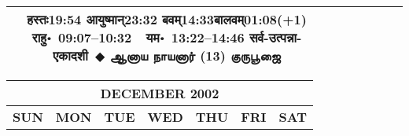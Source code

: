 \documentclass[a3paper,12pt,landscape]{article}
\newcommand{\eventsep}{~$\Diamondblack$ }
\newcommand{\To}{\hspace{1pt}\raisebox{0pt}{\tiny\RIGHTarrow}\hspace{1pt}}
\newcommand{\tamil}[1]{%
{\fontspec[Scale=0.9,FakeStretch=0.9]{Noto Sans Tamil} \footnotesize #1}}
\newcommand{\rahuyama}[2]{%
{राहु॰~\textsf{#1}~~यम॰~\textsf{#2}}
}
\begin{document}
\begin{center}
\begin{tabular}{|c|c|c|c|c|c|c|}
{{\mbox{हस्तः\To{}\textsf{19:54\hspace{2ex}}}}%
{\mbox{आयुष्मान्\To{}\textsf{23:32\hspace{2ex}}}}%
{\mbox{बवम्\To{}\textsf{14:33\hspace{2ex}}}\mbox{बालवम्\To{}\textsf{01:08(+1)\hspace{2ex}}}}}%
{\rahuyama{09:07--10:32}{13:22--14:46}}%
{सर्व-उत्पन्ना-एकादशी\eventsep \tamil{ஆனாய நாயனார் (13) குருபூஜை}}
\\ \hline %
\end{tabular}



\begin{tabular}{|c|c|c|c|c|c|c|}
\multicolumn{7}{c}{\Large \bfseries \sffamily DECEMBER 2002}\\[3mm]
\hline
\textbf{\textsf{SUN}} & \textbf{\textsf{MON}} & \textbf{\textsf{TUE}} & \textbf{\textsf{WED}} & \textbf{\textsf{THU}} & \textbf{\textsf{FRI}} & \textbf{\textsf{SAT}} \\ \hline


\end{tabular}
\end{center}
\end{document}

